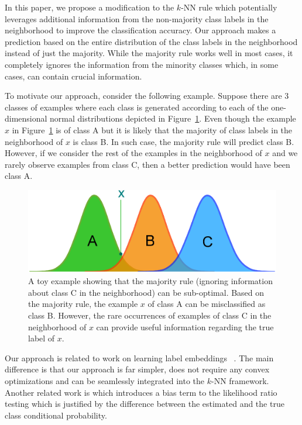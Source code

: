 \documentclass{article}
\begin{document}
In this paper, we propose a modification to the $k$-NN rule which
potentially leverages additional information from the non-majority
class labels in the neighborhood to improve the classification
accuracy. Our approach makes a prediction based on the entire
distribution of the class labels in the neighborhood instead of just
the majority. While the majority rule works well in most cases, it
completely ignores the information from the minority classes which, in
some cases, can contain crucial information.

To motivate our approach, consider the following example. Suppose
there are 3 classes of examples where each class is generated
according to each of the one-dimensional normal distributions depicted in
Figure~\ref{fig:toy_example}. Even though the example $x$ in
Figure~\ref{fig:toy_example} is of class A but it is likely that the
majority of class labels in the neighborhood of $x$ is class B. In
such case, the majority rule will predict class B. However, if we
consider the rest of the examples in the neighborhood of $x$ and we
rarely observe examples from class C, then a better prediction would
have been class A.

\begin{figure}[ht]
\vskip 0.2in
\begin{center}
\centerline{\includegraphics[width=\columnwidth]{figures/toy_example.eps}}
\caption{A toy example showing that the majority rule (ignoring
  information about class C in the neighborhood) can be
  sub-optimal. Based on the majority rule, the example $x$ of class A
  can be misclassified as class B. However, the rare occurrences of
  examples of class C in the neighborhood of $x$ can provide
  useful information regarding the true label of $x$.}
\label{fig:toy_example}
\end{center}
\vskip -0.2in
\end{figure} 

Our approach is related to work on learning label embeddings~
\cite{Collins2009, Bengio2010}. The main difference is that our approach is far
simpler, does not require any convex optimizations and can be
seamlessly integrated into the $k$-NN framework. Another related work
is \cite{Bilmes2001} which introduces a bias term to the likelihood ratio
testing which is justified by the difference between the estimated and
the true class conditional probability.
\end{document}
